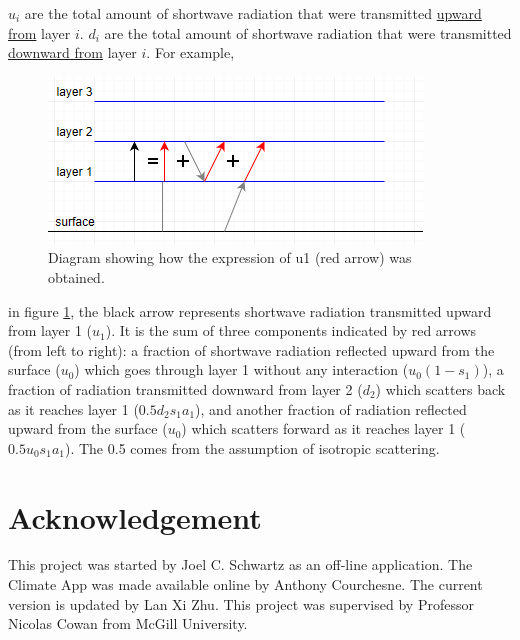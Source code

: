 \documentclass[a4paper,12pt]{article}
\begin{document}
$u_i$ are the total amount of shortwave radiation that were transmitted \underline{upward} \underline{from} layer $i$. $d_i$ are the total amount of shortwave radiation that were transmitted \underline{downward from} layer $i$. For example, 
\begin{figure}[h]
    \centering
    \includegraphics{scatter.PNG}
    \caption{Diagram showing how the expression of u1 (red arrow) was obtained.}
    \label{fig:scatter}
\end{figure}
in figure \ref{fig:scatter}, the black arrow represents shortwave radiation transmitted upward from layer 1 ($u_1$). It is the sum of three components indicated by red arrows (from left to right): a fraction of shortwave radiation reflected upward from the surface ($u_0$) which goes through layer 1 without any interaction ($u_0(1-s_1)$), a fraction of radiation transmitted downward from layer 2 ($d_2$) which scatters back as it reaches layer 1 ($0.5d_2s_1a_1$), and another fraction of radiation reflected upward from the surface ($u_0$) which scatters forward as it reaches layer 1 ($0.5u_0s_1a_1$). The 0.5 comes from the assumption of isotropic scattering.

\section*{Acknowledgement}
This project was started by Joel C. Schwartz as an off-line application. The Climate App was made available online by Anthony Courchesne. The current version is updated by Lan Xi Zhu. This project was supervised by Professor Nicolas Cowan from McGill University.


\newpage
\appendix
\end{document}
